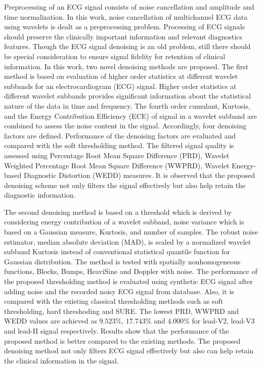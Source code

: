 \noindent Preprocessing of an ECG signal consists of  noise
cancellation and amplitude and time normalization. In this work,
noise cancellation of multichannel ECG data using wavelets is
dealt as a preprocessing problem. Processing of ECG signals should
preserve the clinically important information and relevant
diagnostics features. Though the ECG signal denoising is an old
problem, still there should be special consideration to ensure
signal fidelity for retention of clinical information. In this
work, two novel denoising methods are proposed. The first method
is based on evaluation of higher order statistics at different
wavelet subbands for an electrocardiogram (ECG) signal. Higher
order statistics at different wavelet subbands provides
significant information about the statistical nature of the data
in time and frequency. The fourth order cumulant, Kurtosis, and
the Energy Contribution Efficiency (ECE)  of signal in a wavelet
subband are combined to assess the noise content in the signal.
Accordingly, four denoising factors are defined. Performance of
the denoising factors are evaluated and compared with the soft
thresholding method. The filtered signal quality is assessed using
Percentage Root Mean Square Difference (PRD), Wavelet Weighted
Percentage Root Mean Square Difference (WWPRD), Wavelet
Energy-based Diagnostic Distortion (WEDD) measures. It is observed
that the proposed denoising scheme not only filters the signal
effectively but also help retain the diagnostic information.

The second denoising method is based on a threshold which is derived
by considering energy contribution of a wavelet subband, noise
variance which is based on a  Gaussian measure, Kurtosis, and
number of samples. The robust noise estimator, median absolute
deviation (MAD), is scaled by a normalized wavelet subband
Kurtosis instead of conventional statistical quantile function for
Gaussian distribution.
The method is
tested with spatially nonhomogeneous functions, Blocks, Bumps,
HeaviSine and Doppler with noise. The performance of the proposed
thresholding method is evaluated using synthetic ECG signal after
adding noise and the recorded noisy ECG signal from database. Also, it is
compared with the existing classical thresholding methods such as
soft thresholding, hard threshoding and SURE. The lowest
PRD, WWPRD and WEDD values are achieved as $9.523\%$, $17.743\%$
and $4.000\%$ for lead-V2, lead-V3 and lead-II signal respectively.  Results show that
the performance of the proposed method is better compared to the
existing methods. The proposed denoising method not only filters
ECG signal effectively but also can help retain the clinical
information in the signal.

